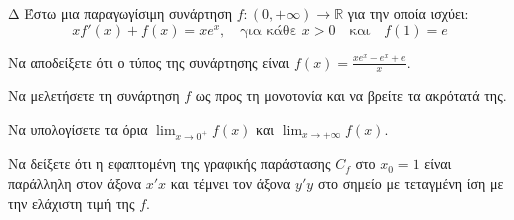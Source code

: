 \begin{thema}{Δ}
Έστω μια παραγωγίσιμη συνάρτηση $f: (0, +\infty) \to \mathbb{R}$ για την οποία ισχύει:
\[ x f'(x) + f(x) = x e^x, \quad \text{για κάθε } x > 0 \quad \text{και} \quad f(1) = e \]
\begin{erwthma}
    \item Να αποδείξετε ότι ο τύπος της συνάρτησης είναι $f(x) = \frac{x e^x - e^x + e}{x}$.
    \item Να μελετήσετε τη συνάρτηση $f$ ως προς τη μονοτονία και να βρείτε τα ακρότατά της.
    \item Να υπολογίσετε τα όρια $\displaystyle\lim_{x\to 0^+} f(x)$ και $\displaystyle\lim_{x\to +\infty} f(x)$.
    \item Να δείξετε ότι η εφαπτομένη της γραφικής παράστασης $C_f$ στο $x_0 = 1$ είναι παράλληλη στον άξονα $x'x$ και τέμνει τον άξονα $y'y$ στο σημείο με τεταγμένη ίση με την ελάχιστη τιμή της $f$.
\end{erwthma}
\end{thema}
